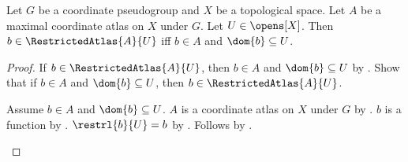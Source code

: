 \begin{theorem}\label{restricted_maximal_atlas_iff}
    Let $G$ be a coordinate pseudogroup and $X$ be a topological space.
    Let $A$ be a maximal coordinate atlas on $X$ under $G$.
    Let $U\in\opens[X]$.
    Then $b\in\RestrictedAtlas{A}{U}$ iff $b\in A$ and $\dom{b}\subseteq U$.
\end{theorem}
\begin{proof}
    If $b\in\RestrictedAtlas{A}{U}$, then $b\in A$ and $\dom{b}\subseteq U$ by
        .
    Show that if $b\in A$ and $\dom{b}\subseteq U$, then $b\in\RestrictedAtlas{A}{U}$.
    \begin{subproof}
        Assume $b\in A$ and $\dom{b}\subseteq U$.
        $A$ is a coordinate atlas on $X$ under $G$ by .
        $b$ is a function by
            .
        $\restrl{b}{U}=b$ by
            .
        Follows by .
    \end{subproof}
\end{proof}


